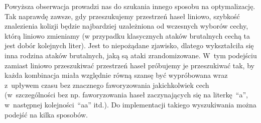 \documentclass[12pt,a4paper,twoside]{article}
\begin{document}
Powyższa obserwacja prowadzi nas do szukania innego sposobu na optymalizację.
Tak naprawdę zawsze, gdy przeszukujemy przestrzeń haseł liniowo, szybkość
znalezienia kolizji będzie najbardziej uzależniona od wczesnych wyborów cechy,
którą liniowo zmieniamy (w przypadku klasycznych ataków brutalnych cechą ta
jest dobór kolejnych liter). Jest to niepożądane zjawisko, dlatego wykształciła
się inna rodzina ataków brutalnych, jaką są ataki zrandomizowane. W~tym
podejściu zamiast liniowo przeszukiwać przestrzeń haseł próbujemy je
przeszukiwać tak, by każda kombinacja miała względnie równą szansę być
wypróbowana wraz z~upływem czasu bez znacznego faworyzowania jakichkolwiek cech
(w~szczególności bez np. faworyzowania haseł zaczynających się na
literkę~``a'', w~następnej kolejności~``aa'' itd.). Do implementacji takiego
wyszukiwania można podejść na kilka sposobów.
\end{document}
